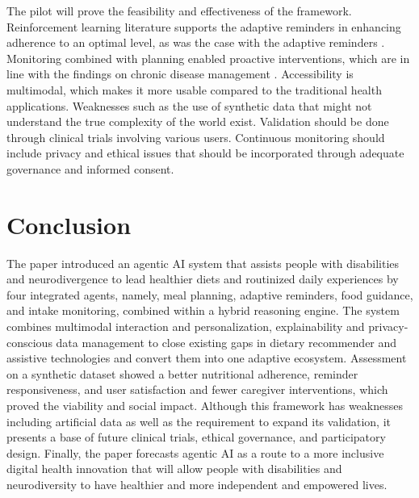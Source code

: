 \documentclass[pdflatex,sn-mathphys-num]{sn-jnl}
\begin{document}
The pilot will prove the feasibility and effectiveness of the framework. Reinforcement learning literature supports the adaptive reminders in enhancing adherence to an optimal level, as was the case with the adaptive reminders \cite{Rabbi2020}. Monitoring combined with planning enabled proactive interventions, which are in line with the findings on chronic disease management \cite{Lemke2022}. Accessibility is multimodal, which makes it more usable compared to the traditional health applications.
Weaknesses such as the use of synthetic data that might not understand the true complexity of the world exist. Validation should be done through clinical trials involving various users. Continuous monitoring should include privacy and ethical issues that should be incorporated through adequate governance and informed consent.



\section{Conclusion}

The paper introduced an agentic AI system that assists people with disabilities and neurodivergence to lead healthier diets and routinized daily experiences by four integrated agents, namely, meal planning, adaptive reminders, food guidance, and intake monitoring, combined within a hybrid reasoning engine. The system combines multimodal interaction and personalization, explainability and privacy-conscious data management to close existing gaps in dietary recommender and assistive technologies and convert them into one adaptive ecosystem. Assessment on a synthetic dataset showed a better nutritional adherence, reminder responsiveness, and user satisfaction and fewer caregiver interventions, which proved the viability and social impact. Although this framework has weaknesses including artificial data as well as the requirement to expand its validation, it presents a base of future clinical trials, ethical governance, and participatory design. Finally, the paper forecasts agentic AI as a route to a more inclusive digital health innovation that will allow people with disabilities and neurodiversity to have healthier and more independent and empowered lives.
	
	\backmatter
	
\end{document}
